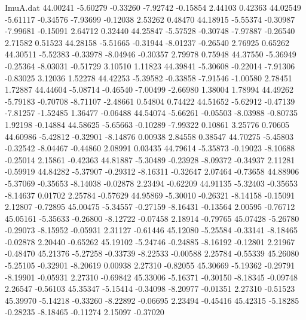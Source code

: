 \begin{filecontents}{ImuA.dat}
  44.00241   -5.60279   -0.33260   -7.92742   -0.15854    2.44103    0.42363
  44.02549   -5.61117   -0.34576   -7.93699   -0.12038    2.53262    0.48470
  44.18915   -5.55374   -0.30987   -7.99681   -0.15091    2.64712    0.32440
  44.25847   -5.57528   -0.30748   -7.97887   -0.26540    2.71582    0.51523
  44.28158   -5.51665   -0.31944   -8.01237   -0.26540    2.76925    0.65262
  44.30511   -5.52383   -0.33978   -8.04946   -0.30357    2.79978    0.75948
  44.37550   -5.36949   -0.25364   -8.03031   -0.51729    3.10510    1.11823
  44.39841   -5.30608   -0.22014   -7.91306   -0.83025    3.12036    1.52278
  44.42253   -5.39582   -0.33858   -7.91546   -1.00580    2.78451    1.72887
  44.44604   -5.08714   -0.46540   -7.00499   -2.66980    1.38004    1.78994
  44.49262   -5.79183   -0.70708   -8.71107   -2.48661    0.54804    0.74422
  44.51652   -5.62912   -0.47139   -7.81257   -1.52485    1.36477   -0.06488
  44.54074   -5.66261   -0.05503   -8.03988   -0.80735    1.92198   -0.14884
  44.58625   -5.65663   -0.10289   -7.99322    0.10861    3.25776    0.70605
  44.60986   -5.42812   -0.32901   -8.14876    0.00938    2.84558    0.38547
  44.70275   -5.45803   -0.32542   -8.04467   -0.44860    2.08991    0.03435
  44.79614   -5.35873   -0.19023   -8.10688   -0.25014    2.15861   -0.42363
  44.81887   -5.30489   -0.23928   -8.09372   -0.34937    2.11281   -0.59919
  44.84282   -5.37907   -0.29312   -8.16311   -0.32647    2.07464   -0.73658
  44.88906   -5.37069   -0.35653   -8.14038   -0.02878    2.23494   -0.62209
  44.91135   -5.32403   -0.35653   -8.14637    0.01702    2.25784   -0.57629
  44.95869   -5.30010   -0.26321   -8.14158   -0.15091    2.12807   -0.72895
  45.00475   -5.34557   -0.27159   -8.16431   -0.13564    2.00595   -0.76712
  45.05161   -5.35633   -0.26800   -8.12722   -0.07458    2.18914   -0.79765
  45.07428   -5.26780   -0.29073   -8.15952   -0.05931    2.31127   -0.61446
  45.12080   -5.25584   -0.33141   -8.18465   -0.02878    2.20440   -0.65262
  45.19102   -5.24746   -0.24885   -8.16192   -0.12801    2.21967   -0.48470
  45.21376   -5.27258   -0.33739   -8.22533   -0.00588    2.25784   -0.55339
  45.26080   -5.25105   -0.32901   -8.20619    0.00938    2.27310   -0.82055
  45.30669   -5.19362   -0.29791   -8.19901   -0.05931    2.27310   -0.69842
  45.33006   -5.16371   -0.30150   -8.18345   -0.09748    2.26547   -0.56103
  45.35347   -5.15414   -0.34098   -8.20977   -0.01351    2.27310   -0.51523
  45.39970   -5.14218   -0.33260   -8.22892   -0.06695    2.23494   -0.45416
  45.42315   -5.18285   -0.28235   -8.18465   -0.11274    2.15097   -0.37020

\end{filecontents}
